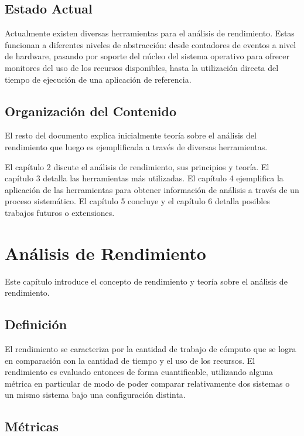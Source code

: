 \documentclass[a4paper]{report}
\begin{document}
\section{Estado Actual}

Actualmente existen diversas herramientas para el an\'alisis de rendimiento.
Estas funcionan a diferentes niveles de abstracci\'on: desde contadores de eventos
a nivel de hardware, pasando por soporte del n\'ucleo del sistema operativo para ofrecer
monitores del uso de los recursos disponibles, hasta la
utilizaci\'on directa del tiempo de ejecuci\'on de una aplicaci\'on de referencia.

\section{Organizaci\'on del Contenido}

El resto del documento explica inicialmente teor\'ia sobre el an\'alisis del rendimiento que luego es
ejemplificada a trav\'es de diversas herramientas.

\bigskip

El cap\'itulo 2 discute el an\'alisis de rendimiento, sus
principios y teor\'ia. El cap\'itulo 3 detalla las herramientas m\'as
utilizadas. El cap\'itulo 4 ejemplifica la aplicaci\'on de las herramientas
para obtener informaci\'on de an\'alisis a trav\'es de un proceso sistem\'atico.
El cap\'itulo 5 concluye y el cap\'itulo 6 detalla posibles trabajos futuros o extensiones.

\chapter{An\'alisis de Rendimiento}

Este cap\'itulo introduce el concepto de rendimiento y teor\'ia sobre el
an\'alisis de rendimiento.

\section{Definici\'on}

El rendimiento se caracteriza por la cantidad de trabajo de c\'omputo que se
logra en comparaci\'on con la cantidad de tiempo y el uso de los recursos.
El rendimiento es evaluado entonces de forma cuantificable, utilizando alguna
m\'etrica en particular de modo de poder comparar relativamente dos sistemas o
un mismo sistema bajo una configuraci\'on distinta.

\section{M\'etricas}
\end{document}
